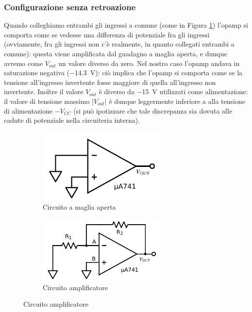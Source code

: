 \subsubsection{Configurazione senza retroazione}

Quando colleghiamo entrambi gli ingressi a comune (come in Figura \ref{cir:open_loop}) l'opamp si comporta come se vedesse una differenza di potenziale fra gli ingressi (ovviamente, fra gli ingressi non c'è realmente, in quanto collegati entrambi a comune): questa viene amplificata dal guadagno a maglia aperta, e dunque avremo come $V_{out}$ un valore diverso da zero. Nel nostro caso l'opamp andava in saturazione negativa (\SI{-14.3}{\volt}): ciò implica che l'opamp si comporta come se la tensione all'ingresso invertente fosse maggiore di quella all'ingresso non invertente. Inoltre il valore $V_{out}$ è diverso da \SI{-15}{\volt} utilizzati come alimentazione: il valore di tensione massimo $|V_{out}|$ è dunque leggermente inferiore a alla tensione di alimentazione $-V_{CC}$ (si può ipotizzare che tale discrepanza sia dovuta alle cadute di potenziale nella circuiteria interna).

\begin{figure}[ht]
        \centering
        \begin{subfigure}[b]{0.35\textwidth}
                 \includegraphics[width=0.70\textwidth]{../E02/latex/open_loop.pdf}
                \caption{Circuito a maglia aperta}
                \label{cir:open_loop}
        \end{subfigure}%
    \quad
        \begin{subfigure}[b]{0.35\textwidth}
               \includegraphics[width=0.70\textwidth]{../E02/latex/inv.pdf}
                \caption{Circuito amplificatore}
                \label{cir:inv}
        \end{subfigure}
     
\end{figure}

